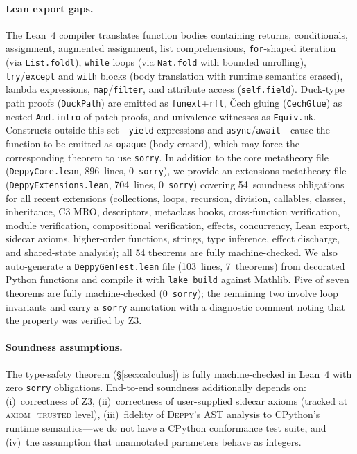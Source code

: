 \documentclass[acmsmall,nonacm,screen]{acmart}
\newcommand{\deppy}{\textsc{Deppy}}
\begin{document}
\paragraph{Lean export gaps.}
The Lean~4 compiler translates function bodies containing returns,
conditionals, assignment, augmented assignment, list comprehensions,
\texttt{for}-shaped iteration (via \texttt{List.foldl}),
\texttt{while} loops (via \texttt{Nat.fold} with bounded unrolling),
\texttt{try}/\texttt{except} and \texttt{with} blocks (body translation
with runtime semantics erased), lambda expressions,
\texttt{map}/\texttt{filter}, and attribute access
(\texttt{self.field}).
Duck-type path proofs (\texttt{DuckPath}) are emitted as
\texttt{funext}+\texttt{rfl}, Čech gluing (\texttt{CechGlue}) as
nested \texttt{And.intro} of patch proofs, and univalence witnesses as
\texttt{Equiv.mk}.
Constructs outside this set---\texttt{yield} expressions and
\texttt{async}/\texttt{await}---cause the function to be emitted as
\texttt{opaque} (body erased), which may force the corresponding
theorem to use \texttt{sorry}.
In addition to the core metatheory file (\texttt{DeppyCore.lean}, 896~lines,
0~\texttt{sorry}), we provide an extensions metatheory file
(\texttt{DeppyExtensions.lean}, 704~lines, 0~\texttt{sorry}) covering
54~soundness obligations for all recent extensions (collections, loops,
recursion, division, callables, classes, inheritance, C3 MRO, descriptors,
metaclass hooks, cross-function verification, module verification,
compositional verification, effects, concurrency, Lean export, sidecar
axioms, higher-order functions, strings, type inference, effect discharge,
and shared-state analysis); all 54 theorems are fully machine-checked.
We also auto-generate a \texttt{DeppyGenTest.lean} file
(103~lines, 7~theorems) from decorated Python functions and compile it
with \texttt{lake build} against Mathlib.  Five of seven theorems are
fully machine-checked (0~\texttt{sorry}); the remaining two involve
loop invariants and carry a \texttt{sorry} annotation with a diagnostic
comment noting that the property was verified by Z3.

\paragraph{Soundness assumptions.}
The type-safety theorem (\S\ref{sec:calculus}) is fully
machine-checked in Lean~4 with zero \texttt{sorry} obligations.
End-to-end soundness additionally depends on:
(i)~correctness of Z3,
(ii)~correctness of user-supplied sidecar axioms (tracked at
\textsc{axiom\_trusted} level),
(iii)~fidelity of \deppy{}'s AST analysis to CPython's runtime
semantics---we do not have a CPython conformance test suite, and
(iv)~the assumption that unannotated parameters behave as integers.
\end{document}
